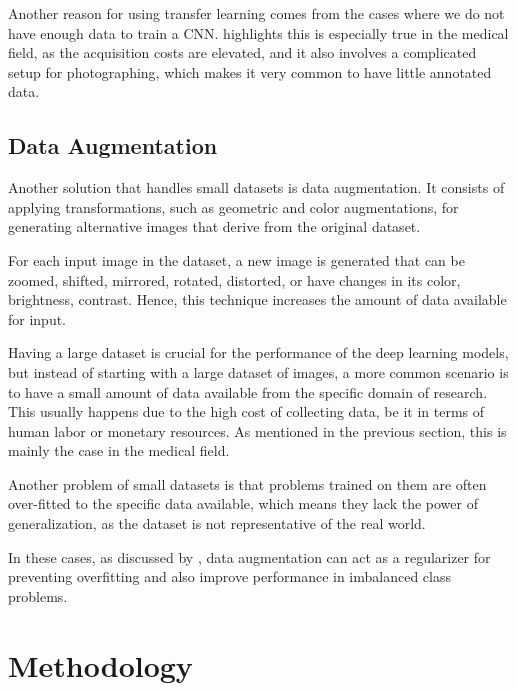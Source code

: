 Another reason for using transfer learning comes from the cases where we do not have enough data to train a CNN. \cite{CelonaBB19} highlights this is especially true in the medical field, as the acquisition costs are elevated, and it also involves a complicated setup for photographing, which makes it very common to have little annotated data.

\subsection{Data Augmentation}

Another solution that handles small datasets is data augmentation. It consists of applying transformations, such as geometric and color augmentations, for generating alternative images that derive from the original dataset.

For each input image in the dataset, a new image is generated that can be zoomed, shifted, mirrored, rotated, distorted, or have changes in its color, brightness, contrast. Hence, this technique increases the amount of data available for input. 

Having a large dataset is crucial for the performance of the deep learning models, but instead of starting with a large dataset of images, a more common scenario is to have a small amount of data available from the specific domain of research. This usually happens due to the high cost of collecting data, be it in terms of human labor or monetary resources. As mentioned in the previous section, this is mainly the case in the medical field. 

Another problem of small datasets is that problems trained on them are often over-fitted to the specific data available, which means they lack the power of generalization, as the dataset is not representative of the real world. 

In these cases, as discussed by \cite{abs-1712-04621}, data augmentation can act as a regularizer for preventing overfitting and also improve performance in imbalanced class problems.


\section{Methodology}

